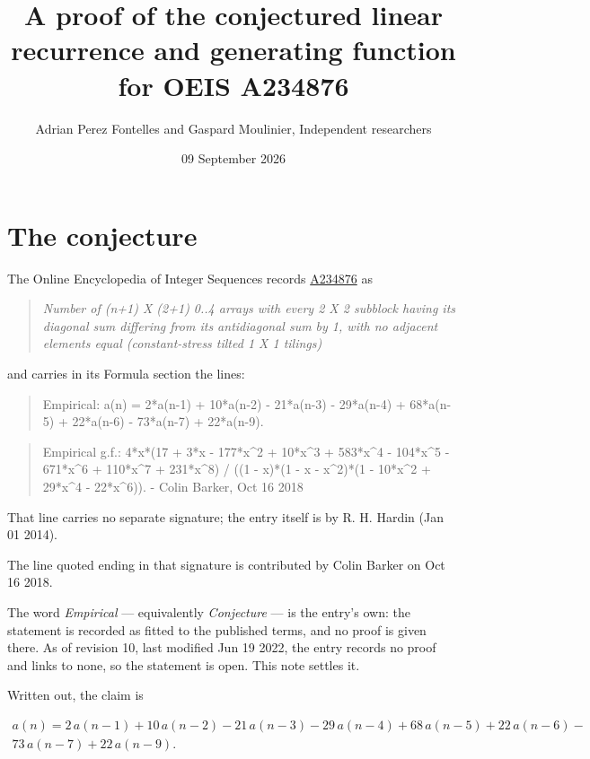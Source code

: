 \documentclass[11pt]{article}
\title{A proof of the conjectured linear recurrence and generating function for OEIS A234876}
\author{Adrian Perez Fontelles and Gaspard Moulinier, Independent researchers}
\date{09 September 2026}
\theoremstyle{definition}
\begin{document}
\maketitle
\section{The conjecture}

The Online Encyclopedia of Integer Sequences records \href{https://oeis.org/A234876}{A234876} as

\begin{quote}\itshape Number of (n+1) X (2+1) 0..4 arrays with every 2 X 2 subblock having its diagonal sum differing from its antidiagonal sum by 1, with no adjacent elements equal (constant-stress tilted 1 X 1 tilings)\end{quote}

and carries in its Formula section the lines:

\begin{quote}\ttfamily Empirical: a(n) = 2*a(n-1) + 10*a(n-2) - 21*a(n-3) - 29*a(n-4) + 68*a(n-5) + 22*a(n-6) - 73*a(n-7) + 22*a(n-9).\end{quote}

\begin{quote}\ttfamily Empirical g.f.: 4*x*(17 + 3*x - 177*x\textasciicircum{}2 + 10*x\textasciicircum{}3 + 583*x\textasciicircum{}4 - 104*x\textasciicircum{}5 - 671*x\textasciicircum{}6 + 110*x\textasciicircum{}7 + 231*x\textasciicircum{}8) / ((1 - x)*(1 - x - x\textasciicircum{}2)*(1 - 10*x\textasciicircum{}2 + 29*x\textasciicircum{}4 - 22*x\textasciicircum{}6)). - Colin Barker, Oct 16 2018\end{quote}

That line carries no separate signature; the entry itself is by R. H. Hardin (Jan 01 2014).

The line quoted ending in that signature is contributed by Colin Barker on Oct 16 2018.

The word {\itshape Empirical} --- equivalently {\itshape Conjecture} --- is the entry's own: the statement is recorded as fitted to the published terms, and no proof is given there. As of revision 10, last modified Jun 19 2022, the entry records no proof and links to none, so the statement is open. This note settles it.

Written out, the claim is

\begin{multline*} a(n) = 2\,a(n-1) + 10\,a(n-2) - 21\,a(n-3) - 29\,a(n-4) + 68\,a(n-5) + 22\,a(n-6) - \\ 73\,a(n-7) + 22\,a(n-9). \end{multline*}
\end{document}
